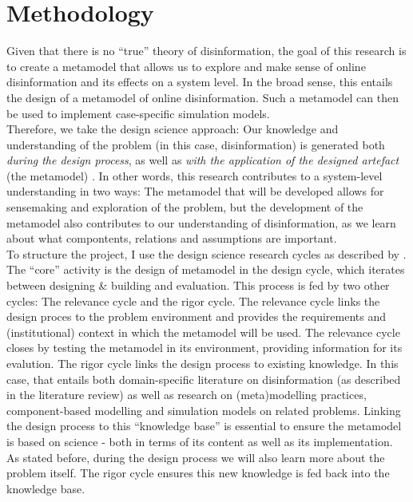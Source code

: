 \section{Methodology}
Given that there is no ``true'' theory of disinformation, the goal of this research is to create a metamodel that allows us to explore and make sense of online disinformation and its effects on a system level. In the broad sense, this entails the design of a metamodel of online disinformation. Such a metamodel  can then be used to implement case-specific simulation models. \\

Therefore, we take the design science approach: Our knowledge and understanding of the problem (in this case, disinformation) is generated both \textit{during the design process}, as well as \textit{with the application of the designed artefact} (the metamodel) \citep{Hevner2004}. In other words, this research contributes to a system-level understanding in two ways: The metamodel that will be developed allows for sensemaking and exploration of the problem, but the development of the metamodel also contributes to our understanding of disinformation, as we learn about what compontents, relations and assumptions are important. \\

To structure the project, I use the design science research cycles as described by \cite{Hevner2010}. The ``core'' activity is the design of metamodel in the design cycle, which iterates between designing \& building and evaluation. This process is fed by two other cycles: The relevance cycle and the rigor cycle. The relevance cycle links the design proces to the problem environment and provides the requirements and (institutional) context in which the metamodel will be used. The relevance cycle closes by testing the metamodel in its environment, providing information for its evalution. The rigor cycle links the design process to existing knowledge. In this case, that entails both domain-specific literature on disinformation (as described in the literature review) as well as research on (meta)modelling practices, component-based modelling and simulation models on related problems. Linking the design process to this ``knowledge base'' is essential to ensure the metamodel is based on science - both in terms of its content as well as its implementation. As stated before, during the design process we will also learn more about the problem itself. The rigor cycle ensures this new knowledge is fed back into the knowledge base.\\

